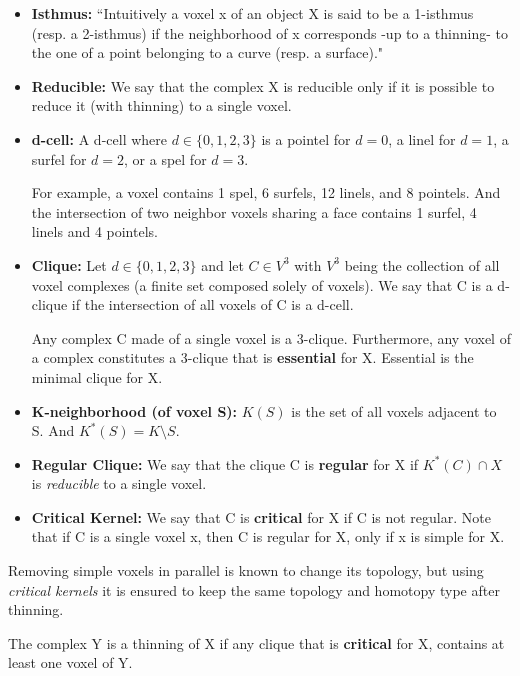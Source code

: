 \begin{itemize}[topsep=0pt]
  \item \textbf{Isthmus: } ``Intuitively a voxel x of an object X is said to be a 1-isthmus (resp. a 2-isthmus)
    if the neighborhood of x corresponds -up to a thinning- to the one of a point belonging to a curve (resp. a surface)."
  \item \textbf{Reducible: } We say that the complex X is reducible only if it is possible to reduce it (with thinning) to a single voxel.
  \item \textbf{d-cell: }
    A d-cell where $ d \in \{0,1,2,3\} $ is a pointel for $d = 0$, a linel for $d = 1$, a surfel for
    $d = 2$, or a spel for $d = 3$.

    For example, a voxel contains 1 spel, 6 surfels, 12 linels, and 8 pointels. And the intersection of two neighbor voxels sharing a face contains 1 surfel, 4 linels and 4 pointels.
  \item \textbf{Clique: }
    Let $ d \in \{0,1,2,3\} $ and let $ C \in V^3 $ with $V^3$ being the collection of all
    voxel complexes (a finite set composed solely of voxels).
    We say that C is a d-clique if the intersection of all voxels of C is a d-cell.

    Any complex C made of a single voxel is a 3-clique. Furthermore, any voxel of a complex
    constitutes a 3-clique that is \textbf{essential} for X. Essential is the minimal clique for X.
  \item \textbf{K-neighborhood (of voxel S): }
    $K(S)$ is the set of all voxels adjacent to S. And $K^*(S) = K \setminus  S$.
  \item \textbf{Regular Clique: }
    We say that the clique C is \textbf{regular} for X if $K^*(C) \cap X $ is \textit{reducible} to a
    single voxel.
  \item \textbf{Critical Kernel: }
    We say that C is \textbf{critical} for X if C is not regular.
    Note that if C is a single voxel x, then C is regular for X, only if x is simple for X.
\end{itemize}

Removing simple voxels in parallel is known to change its topology, but using \textit{critical kernels} it is ensured to keep the same topology and homotopy type after thinning.

\begin{theorem}
  The complex Y is a thinning of X if any clique that is \textbf{critical} for X,
  contains at least one voxel of Y.
\end{theorem}

